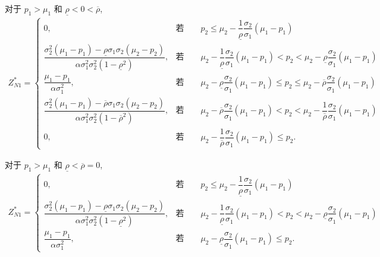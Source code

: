 \documentclass[10.0pt]{article}
\begin{document}
对于 $ p_1 > \mu_1 $ 和 $ \underline{\rho} < 0 < \overline{\rho} $,
{\footnotesize \begin{eqnarray}
Z_{N 1}^* = \left\{ \begin{matrix}
0, & \text{若} \qquad p_2 \leqslant \mu_2 - \dfrac1{\underline{\rho}} \dfrac{\sigma_2}{\sigma_1} (\mu_1 - p_1) \\
\dfrac{\sigma_2^2 (\mu_1 - p_1) - \underline{\rho} \sigma_1 \sigma_2 (\mu_2 - p_2)}{\alpha \sigma_1^2 \sigma_2^2 (1 - \underline{\rho}^2)}, & \text{若} \qquad \mu_2 - \dfrac1{\underline{\rho}} \dfrac{\sigma_2}{\sigma_1} (\mu_1 - p_1) < p_2 < \mu_2 - \underline{\rho} \dfrac{\sigma_2}{\sigma_1} (\mu_1 - p_1) \\
\dfrac{\mu_1 - p_1}{\alpha \sigma_1^2}, & \text{若} \qquad \mu_2 - \underline{\rho} \dfrac{\sigma_2}{\sigma_1} (\mu_1 - p_1) \leqslant p_2 \leqslant \mu_2 - \overline{\rho} \dfrac{\sigma_2}{\sigma_1} (\mu_1 - p_1) \\
\dfrac{\sigma_2^2 (\mu_1 - p_1) - \overline{\rho} \sigma_1 \sigma_2 (\mu_2 - p_2)}{\alpha \sigma_1^2 \sigma_2^2 (1 - \overline{\rho}^2)}, & \text{若} \qquad \mu_2 - \overline{\rho} \dfrac{\sigma_2}{\sigma_1} (\mu_1 - p_1) < p_2 < \mu_2 - \dfrac1{\overline{\rho}} \dfrac{\sigma_2}{\sigma_1} (\mu_1 - p_1) \\
0, & \text{若} \qquad \mu_2 - \dfrac1{\overline{\rho}} \dfrac{\sigma_2}{\sigma_1} (\mu_1 - p_1) \leqslant p_2.
\end{matrix} \right.
\end{eqnarray}}

对于 $ p_1 > \mu_1 $ 和 $ \underline{\rho} < \overline{\rho} = 0 $,
{\footnotesize \begin{eqnarray}
Z_{N 1}^* = \left\{ \begin{matrix}
0, & \text{若} \qquad p_2 \leqslant \mu_2 - \dfrac1{\underline{\rho}} \dfrac{\sigma_2}{\sigma_1} (\mu_1 - p_1) \\
\dfrac{\sigma_2^2 (\mu_1 - p_1) - \underline{\rho} \sigma_1 \sigma_2 (\mu_2 - p_2)}{\alpha \sigma_1^2 \sigma_2^2 (1 - \underline{\rho}^2)}, & \text{若} \qquad \mu_2 - \dfrac1{\underline{\rho}} \dfrac{\sigma_2}{\sigma_1} (\mu_1 - p_1) < p_2 < \mu_2 - \underline{\rho} \dfrac{\sigma_2}{\sigma_1} (\mu_1 - p_1) \\
\dfrac{\mu_1 - p_1}{\alpha \sigma_1^2}, & \text{若} \qquad \mu_2 - \underline{\rho} \dfrac{\sigma_2}{\sigma_1} (\mu_1 - p_1) \leqslant p_2.
\end{matrix} \right.
\end{eqnarray}}
\end{document}
